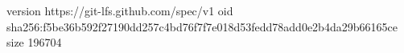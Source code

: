 version https://git-lfs.github.com/spec/v1
oid sha256:f5be36b592f27190dd257c4bd76f7f7e018d53fedd78add0e2b4da29b66165ce
size 196704
